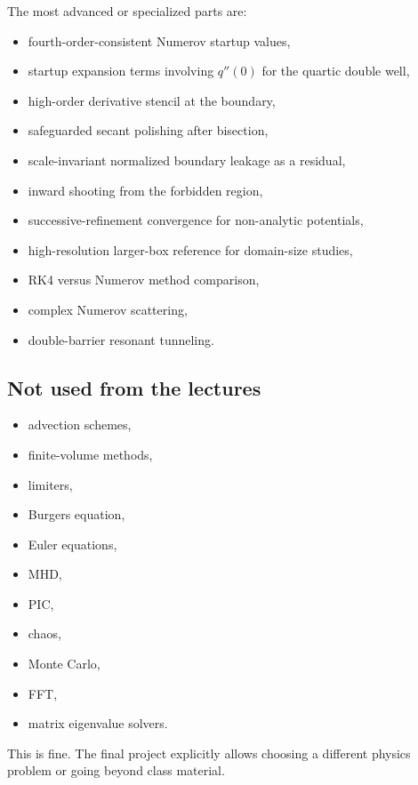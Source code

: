 \documentclass[11pt]{article}
\begin{document}
    The most advanced or specialized parts are:
    \begin{itemize}
        \item fourth-order-consistent Numerov startup values,
        \item startup expansion terms involving $q''(0)$ for the quartic double well,
        \item high-order derivative stencil at the boundary,
        \item safeguarded secant polishing after bisection,
        \item scale-invariant normalized boundary leakage as a residual,
        \item inward shooting from the forbidden region,
        \item successive-refinement convergence for non-analytic potentials,
        \item high-resolution larger-box reference for domain-size studies,
        \item RK4 versus Numerov method comparison,
        \item complex Numerov scattering,
        \item double-barrier resonant tunneling.
    \end{itemize}

    \subsection{Not used from the lectures}

    \begin{itemize}
        \item advection schemes,
        \item finite-volume methods,
        \item limiters,
        \item Burgers equation,
        \item Euler equations,
        \item MHD,
        \item PIC,
        \item chaos,
        \item Monte Carlo,
        \item FFT,
        \item matrix eigenvalue solvers.
    \end{itemize}

    This is fine. The final project explicitly allows choosing a different physics problem or going beyond class material.
\end{document}
